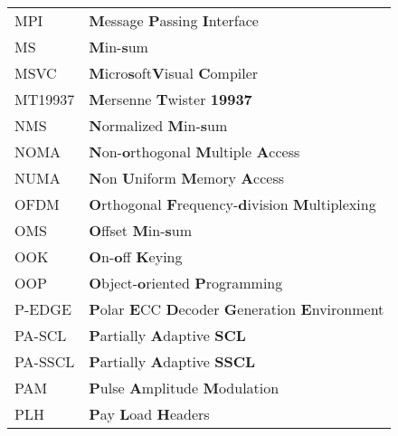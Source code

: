 \begin{center}
\begin{longtable}{ p{}  p{} }
MPI         & \textbf{M}essage \textbf{P}assing \textbf{I}nterface                                                            \\
MS          & \textbf{M}in-\textbf{s}um                                                                                       \\
MSVC        & \textbf{M}icro\textbf{s}oft\R \textbf{V}isual \textbf{C}ompiler                                                 \\
MT19937     & \textbf{M}ersenne \textbf{T}wister \textbf{19937}                                                               \\
NMS         & \textbf{N}ormalized \textbf{M}in-\textbf{s}um                                                                   \\
NOMA        & \textbf{N}on-\textbf{o}rthogonal \textbf{M}ultiple \textbf{A}ccess                                              \\
NUMA        & \textbf{N}on \textbf{U}niform \textbf{M}emory \textbf{A}ccess                                                   \\
OFDM        & \textbf{O}rthogonal \textbf{F}requency-\textbf{d}ivision \textbf{M}ultiplexing                                  \\
OMS         & \textbf{O}ffset \textbf{M}in-\textbf{s}um                                                                       \\
OOK         & \textbf{O}n-\textbf{o}ff \textbf{K}eying                                                                        \\
OOP         & \textbf{O}bject-\textbf{o}riented \textbf{P}rogramming                                                          \\
P-EDGE      & \textbf{P}olar \textbf{E}CC \textbf{D}ecoder \textbf{G}eneration \textbf{E}nvironment                           \\
PA-SCL      & \textbf{P}artially \textbf{A}daptive \textbf{SCL}                                                               \\
PA-SSCL     & \textbf{P}artially \textbf{A}daptive \textbf{SSCL}                                                              \\
PAM         & \textbf{P}ulse \textbf{A}mplitude \textbf{M}odulation                                                           \\
PLH         & \textbf{P}ay \textbf{L}oad \textbf{H}eaders                                                                     \\

\end{longtable}
\end{center}
